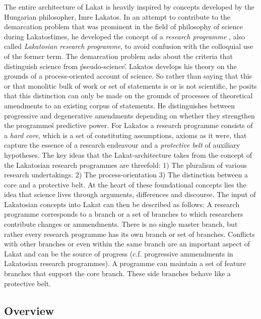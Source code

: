 \documentclass[14pt]{article}
\begin{document}
The entire architecture of Lakat is heavily inspired by concepts developed by the Hungarian philosopher, Imre Lakatos. In an attempt to contribute to the demarcation problem \cite{popper1959logic,lakatos1978falsification,feyerabend1975against,pigliucci2013demarcation} that was prominent in the field of philosophy of science during Lakatos\' times, he developed the concept of a \textit{research programme} \cite{lakatos1980methodology, worrall1980methodology, gavroglu1989imre}, also called \textit{Lakatosian research programme}, to avoid confusion with the colloquial use of the former term. The demarcation problem asks about the criteria that distinguish science from \'pseudo-science\'. Lakatos develops his theory on the grounds of a process-oriented account of science. So rather than saying that this or that monolitic bulk of work or set of statements is or is not scientific, he posits that this distinction can only be made on the grounds of processes of theoretical amendments to an existing corpus of statements. He distinguishes between progressive and degenerative amendments depending on whether they strengthen the programme\'s predictive power. For Lakatos a research programme consists of a \textit{hard core}, which is a set of constituting assumptions, axioms as it were, that capture the essence of a research endeavour and a \textit{protective belt} of auxiliary hypotheses. The key ideas that the Lakat-architecture takes from the concept of the Lakatosian research programmes are threefold: 1) The pluralism of various research undertakings. 2) The process-orientation 3) The distinction between a core and a protective belt. At the heart of these foundational concepts lies the idea that science lives through arguments, differences and discourse. The input of Lakatosian concepts into Lakat can then be described as follows: A research programme corresponds to a branch or a set of branches to which researchers contribute changes or ammendments. There is no single master branch, but rather every research programme has its own branch or set of branches. Conflicts with other branches or even within the same branch are an important aspect of Lakat and can be the source of progress (c.f. progressive ammendments in Lakatosian research programmes). A programme can maintain a set of feature branches that support the core branch. These side branches behave like a protective belt.  
% 

\subsection{Overview}
\end{document}

